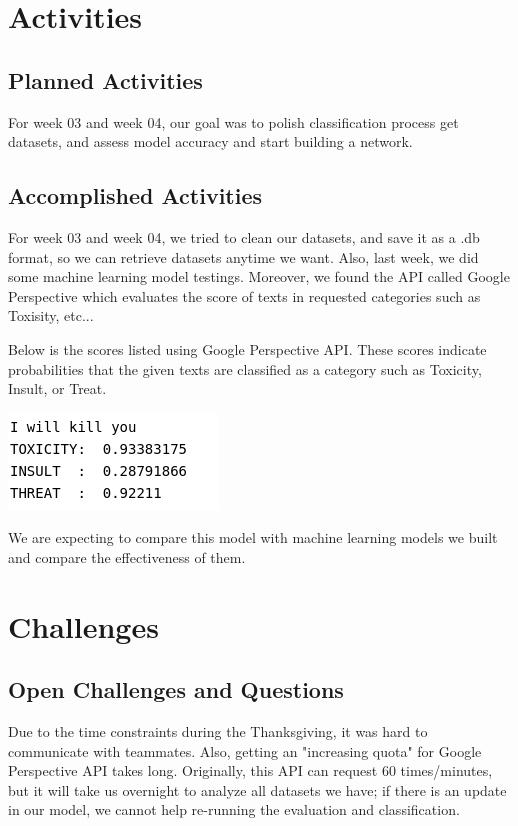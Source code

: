 \documentclass{article}
\begin{document}
\begin{multicols}{2}
\section{Activities}
    \subsection{Planned Activities}
      
    \hspace{5mm}For week 03 and week 04, our goal was to polish classification process get datasets, and assess model accuracy and start building a network. 
    \subsection{Accomplished Activities}
    \hspace{5mm} For week 03 and week 04, we tried to clean our datasets, and save it as a .db format, so we can retrieve datasets anytime we want. Also, last week, we did some machine learning model testings. Moreover, we found the API called Google Perspective which evaluates the score of texts in requested categories such as Toxisity, etc...
    
    Below is the scores listed using Google Perspective API. These scores indicate probabilities that the given texts are classified as a category such as Toxicity, Insult, or Treat.
    
    \vspace{2mm}
    \includegraphics[scale=0.49]{image.png}
    \vspace{-3mm}

    \vspace{2mm}
    \hspace{5mm}We are expecting to compare this model with machine learning models we built and compare the effectiveness of them.
\section{Challenges}
    \subsection{Open Challenges and Questions}
    \hspace{5mm}Due to the time constraints during the Thanksgiving, it was hard to communicate with teammates. Also, getting an "increasing quota" for Google Perspective API takes long. Originally, this API can request 60 times/minutes, but it will take us overnight to analyze all datasets we have; if there is an update in our model, we cannot help re-running the evaluation and classification.
    

\end{multicols}
\end{document}
